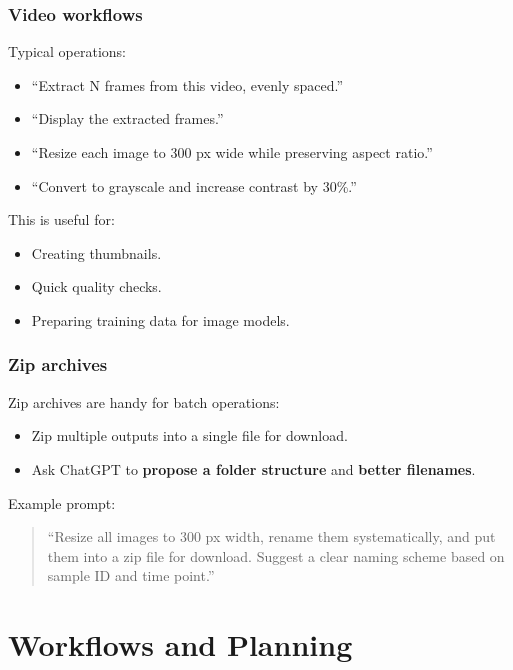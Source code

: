 \documentclass[
  letterpaper,
  DIV=11,
  numbers=noendperiod]{scrreprt}
\providecommand{\tightlist}{%
  \setlength{\itemsep}{0pt}\setlength{\parskip}{0pt}}
\begin{document}
\subsubsection{Video workflows}\label{video-workflows}

Typical operations:

\begin{itemize}
\tightlist
\item
  ``Extract N frames from this video, evenly spaced.''
\item
  ``Display the extracted frames.''
\item
  ``Resize each image to 300 px wide while preserving aspect ratio.''
\item
  ``Convert to grayscale and increase contrast by 30\%.''
\end{itemize}

This is useful for:

\begin{itemize}
\tightlist
\item
  Creating thumbnails.
\item
  Quick quality checks.
\item
  Preparing training data for image models.
\end{itemize}

\subsubsection{Zip archives}\label{zip-archives}

Zip archives are handy for batch operations:

\begin{itemize}
\tightlist
\item
  Zip multiple outputs into a single file for download.
\item
  Ask ChatGPT to \textbf{propose a folder structure} and \textbf{better
  filenames}.
\end{itemize}

Example prompt:

\begin{quote}
``Resize all images to 300 px width, rename them systematically, and put
them into a zip file for download. Suggest a clear naming scheme based
on sample ID and time point.''
\end{quote}

\section{Workflows and Planning}\label{workflows-and-planning}
\end{document}

